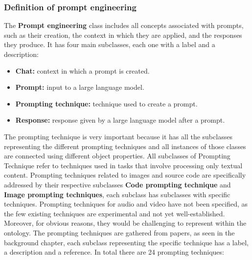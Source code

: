 \subsubsection{Definition of prompt engineering}
The \textbf{Prompt engineering} class includes all concepts associated with prompts, such as their creation, the context in which they are applied, and the responses they produce. It has four main subclasses, each one with a label and a description:
\begin{itemize}
    \item \textbf{Chat:} context in which a prompt is created. 
    \item \textbf{Prompt:} input to a large language model.
    \item \textbf{Prompting technique:} technique used to create a prompt.
    \item \textbf{Response:} response given by a large language model after a prompt.
\end{itemize}
The prompting technique is very important because it has all the subclasses representing the different prompting techniques and all instances of those classes are connected using different object properties. All subclasses of Prompting Technique refer to techniques used in tasks that involve processing only textual content. Prompting techniques related to images and source code are specifically addressed by their respective subclasses \textbf{Code prompting technique} and \textbf{Image prompting techniques}, each subclass has subclasses with specific techniques. Prompting techniques for audio and video have not been specified, as the few existing techniques are experimental and not yet well-established. Moreover, for obvious reasons, they would be challenging to represent within the ontology. The prompting techniques are gathered from papers, as seen in the background chapter, each subclass representing the specific technique has a label, a description and a reference. In total there are 24 prompting techniques:
